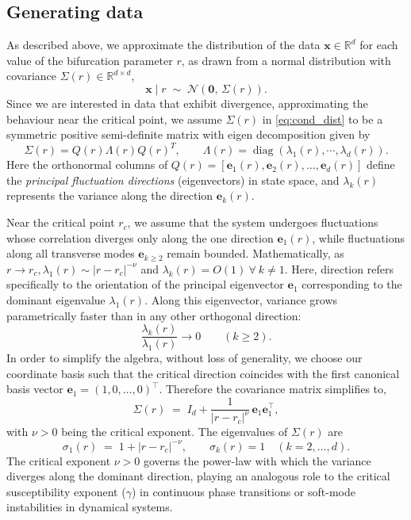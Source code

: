 \documentclass[11pt,a4paper]{article}
\theoremstyle{remark}
\newcommand{\R}{\mathbb{R}}
\newcommand{\bx}{\mathbf{x}}
\newcommand{\be}{\mathbf{e}}
\newcommand{\diag}{\operatorname{diag}}
\begin{document}
\begin{onehalfspace}
\subsection{Generating data}\label{subsec:generation}
As described above, we approximate the distribution of the data $\bx \in \R^d$ for each value of the bifurcation parameter $r$, as drawn from a normal distribution with covariance $\Sigma(r) \in \R^{d \times d}$,
\begin{equation}
\bx \mid r \;\sim\; \mathcal{N}\!\left(\mathbf{0},\, \Sigma(r)\right).
\label{eq:cond_dist}
\end{equation}
Since we are interested in data that exhibit divergence, approximating the behaviour near the critical point, we assume $\Sigma(r)$ in \eqref{eq:cond_dist} to be a symmetric positive semi-definite matrix with eigen decomposition given by
\begin{equation}\label{eq:eigenForm}
    \Sigma(r) = Q(r)\Lambda(r)Q(r)^T, \qquad  \Lambda(r) = \diag(\lambda_1(r),\cdots,\lambda_d(r)).
\end{equation}
Here the orthonormal columns of $Q(r) = [\be_1(r), \be_2(r),\ldots, \be_d(r)]$ define the \emph{principal fluctuation directions} (eigenvectors) in state space, and $\lambda_k(r)$ represents the variance along the direction $\be_k(r)$.

Near the critical point $r_c$, we assume that the system undergoes fluctuations whose correlation diverges only along the one direction $\be_1(r)$, while fluctuations along all transverse modes $\be_{k\geq 2}$ remain bounded. Mathematically, as $r\to r_c, \lambda_1(r)\sim |r - r_c|^{-\nu}$ and $\lambda_k(r)=O(1)\ \forall\ k \neq 1$. Here, direction refers specifically to the orientation of the principal eigenvector $\be_1$ corresponding to the dominant eigenvalue $\lambda_1(r)$. Along this eigenvector, variance grows parametrically faster than in any other orthogonal direction:
\[
\dfrac{\lambda_k(r)}{\lambda_1(r)}\to 0 \qquad (k \geq 2).
\]
In order to simplify the algebra, without loss of generality, we choose our coordinate basis such that the critical direction coincides with the first canonical basis vector $\be_1 = (1, 0, \ldots, 0)^\top$. Therefore the covariance matrix simplifies to,
\begin{equation}\label{eq:corr_matrix}
\Sigma(r) \;=\; I_d + \frac{1}{|r-r_c|^{\nu}} \, \be_1 \be_1^\top,
\end{equation}
with $\nu > 0$ being the critical exponent. The eigenvalues of $\Sigma(r)$ are
\[
\sigma_1(r) \;=\; 1 + |r-r_c|^{-\nu}, \qquad \sigma_k(r) = 1 \quad (k=2,\ldots,d).
\]
The critical exponent $\nu > 0$ governs the power-law with which the variance diverges along the dominant direction, playing an analogous role to the critical susceptibility exponent ($\gamma$) in continuous phase transitions or soft-mode instabilities in dynamical systems.


\end{onehalfspace}
\end{document}
